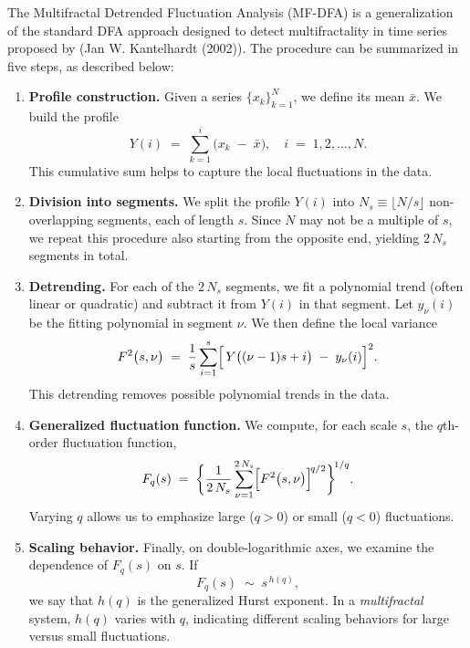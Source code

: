 \documentclass[11pt]{extarticle}
\begin{document}
The Multifractal Detrended Fluctuation Analysis (MF-DFA) is a generalization of the standard DFA approach designed to detect multifractality in time series proposed by (Jan W. Kantelhardt (2002)). The procedure can be summarized in five steps, as described below:

\begin{enumerate}
    \item \textbf{Profile construction.} Given a series $\{x_k\}_{k=1}^N$, we define its mean  \(\bar{x}\). We build the profile
    \[
        Y(i) \;=\; \sum_{k=1}^{i} \bigl(x_k \;-\; \bar{x}\bigr),
        \quad i \;=\; 1,2,\dots,N.
    \]
    This cumulative sum helps to capture the local fluctuations in the data.

    \item \textbf{Division into segments.} We split the profile $Y(i)$ into $N_s \equiv \lfloor N/s \rfloor$ non-overlapping segments, each of length $s$. Since $N$ may not be a multiple of $s$, we repeat this procedure also starting from the opposite end, yielding $2\,N_s$ segments in total.

    \item \textbf{Detrending.} For each of the $2\,N_s$ segments, we fit a polynomial trend (often linear or quadratic) and subtract it from $Y(i)$ in that segment. Let $y_\nu(i)$ be the fitting polynomial in segment $\nu$. We then define the local variance
    \[
        F^2\bigl(s,\nu\bigr)
        \;=\;
        \frac{1}{s}
        \sum_{i=1}^s
        \Bigl[\,Y\bigl((\nu-1)s + i\bigr)\;-\;y_\nu(i)\Bigr]^2.
    \]
    This detrending removes possible polynomial trends in the data.

    \item \textbf{Generalized fluctuation function.} We compute, for each scale $s$, the $q$th-order fluctuation function,
    \[
        F_q(s)
        \;=\;
        \biggl\{
          \frac{1}{2\,N_s}
          \sum_{\nu=1}^{2\,N_s}
          \Bigl[
            F^2\bigl(s,\nu\bigr)
          \Bigr]^{\!q/2}
        \biggr\}^{\!1/q}.
    \]
    Varying $q$ allows us to emphasize large ($q>0$) or small ($q<0$) fluctuations.

    \item \textbf{Scaling behavior.} Finally, on double-logarithmic axes, we examine the dependence of $F_q(s)$ on $s$. If
    \[
        F_q(s) \;\sim\; s^{\,h(q)},
    \]
    we say that $h(q)$ is the generalized Hurst exponent. In a \emph{multifractal} system, $h(q)$ varies with $q$, indicating different scaling behaviors for large versus small fluctuations.
\end{enumerate}
\end{document}
